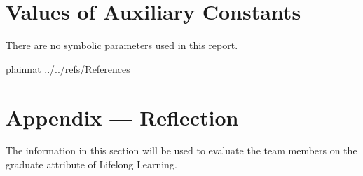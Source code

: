 \documentclass[12pt]{article}
\begin{document}
\section{Values of Auxiliary Constants}

There are no symbolic parameters used in this report.

\newpage

 {plainnat}
 {../../refs/References}

\newpage


\newpage{}
\section*{Appendix --- Reflection}

The information in this section will be used to evaluate the team members on the
graduate attribute of Lifelong Learning.  
\end{document}

